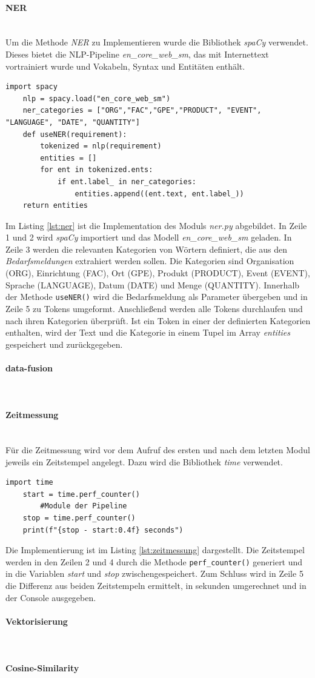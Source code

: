 \paragraph{NER}\mbox{}\\
Um die Methode \emph{NER} zu Implementieren wurde die Bibliothek \emph{spaCy} verwendet. Dieses bietet die NLP-Pipeline \emph{en\_core\_web\_sm}, das mit Internettext vortrainiert wurde und Vokabeln, Syntax und Entitäten enthält.
\begin{lstlisting}[caption={Implementation des Moduls \emph{ner.py}}, label=lst:ner]
	import spacy
	nlp = spacy.load("en_core_web_sm")
	ner_categories = ["ORG","FAC","GPE","PRODUCT", "EVENT", "LANGUAGE", "DATE", "QUANTITY"]
	def useNER(requirement):
		tokenized = nlp(requirement)
		entities = []
		for ent in tokenized.ents:
			if ent.label_ in ner_categories:
				entities.append((ent.text, ent.label_))
	return entities
\end{lstlisting}
Im Listing \ref{lst:ner} ist die Implementation des Moduls \emph{ner.py} abgebildet. In Zeile 1 und 2 wird \emph{spaCy} importiert und das Modell \emph{en\_core\_web\_sm} geladen. In Zeile 3 werden die relevanten Kategorien von Wörtern definiert, die aus den \emph{Bedarfsmeldungen} extrahiert werden sollen. Die Kategorien sind Organisation (ORG), Einrichtung (FAC), Ort (GPE), Produkt (PRODUCT), Event (EVENT), Sprache (LANGUAGE), Datum (DATE) und Menge (QUANTITY). Innerhalb der Methode \lstinline{useNER()} wird die Bedarfsmeldung als Parameter übergeben und in Zeile 5 zu Tokens umgeformt. Anschließend werden alle Tokens durchlaufen und nach ihren Kategorien überprüft. Ist ein Token in einer der definierten Kategorien enthalten, wird der Text und die Kategorie in einem Tupel im Array \emph{entities} gespeichert und zurückgegeben.
\paragraph{data-fusion}\mbox{}\\

\paragraph{Zeitmessung}\mbox{}\\
Für die Zeitmessung wird vor dem Aufruf des ersten und nach dem letzten Modul jeweils ein Zeitstempel angelegt. Dazu wird die Bibliothek \emph{time} verwendet.
\begin{lstlisting}[caption={Implementation der Zeitmessung}, label=lst:zeitmessung]
	import time
	start = time.perf_counter()
		#Module der Pipeline
	stop = time.perf_counter()
	print(f"{stop - start:0.4f} seconds")
\end{lstlisting}
Die Implementierung ist im Listing \ref{lst:zeitmessung} dargestellt. Die Zeitstempel werden in den Zeilen 2 und 4 durch die Methode \lstinline{perf_counter()}
generiert und in die Variablen \emph{start} und \emph{stop} zwischengespeichert. Zum Schluss wird in Zeile 5 die Differenz aus beiden Zeitstempeln ermittelt, in sekunden umgerechnet und in der Console ausgegeben.
\paragraph{Vektorisierung}\mbox{}\\

\paragraph{Cosine-Similarity}\mbox{}\\